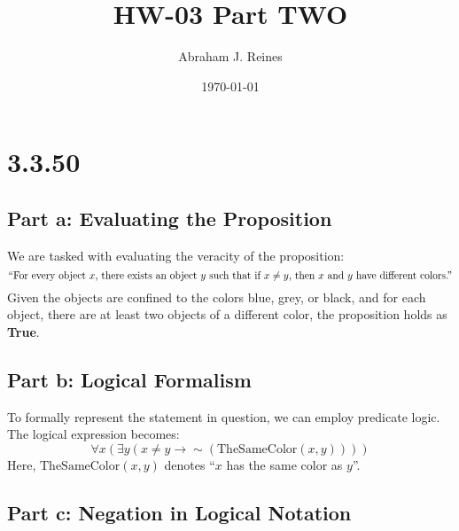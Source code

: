 \documentclass[12pt]{article}
\begin{document}
\doublespacing

\title{HW-03 Part TWO}
\author{Abraham J. Reines}
\date{\today}
\maketitle

\section{3.3.50}
\subsection{Part a: Evaluating the Proposition}
We are tasked with evaluating the veracity of the proposition:
\[
\text{``For every object \( x \), there exists an object \( y \) such that if \( x \neq y \), then \( x \) and \( y \) have different colors.''}
\]
Given the objects are confined to the colors blue, grey, or black, and for each object, there are at least two objects of a different color, the proposition holds as \textbf{True}.

\subsection{Part b: Logical Formalism}
To formally represent the statement in question, we can employ predicate logic. The logical expression becomes:
\[
\forall x \left( \exists y \left( x \neq y \rightarrow \sim (\text{TheSameColor}(x, y)) \right) \right)
\]
Here, \(\text{TheSameColor}(x, y)\) denotes ``\( x \) has the same color as \( y \)''.

\subsection{Part c: Negation in Logical Notation}
\end{document}
